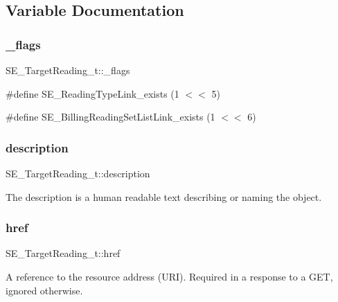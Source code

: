 \subsection{Variable Documentation}
\mbox{\label{group__TargetReading_gaaf344e38f87e901981538342c80f3d6f}} 
\subsubsection{\texorpdfstring{\+\_\+flags}{\_flags}}
{\footnotesize\ttfamily S\+E\+\_\+\+Target\+Reading\+\_\+t\+::\+\_\+flags}

\#define S\+E\+\_\+\+Reading\+Type\+Link\+\_\+exists (1 $<$$<$ 5)

\#define S\+E\+\_\+\+Billing\+Reading\+Set\+List\+Link\+\_\+exists (1 $<$$<$ 6) \mbox{\label{group__TargetReading_gab528105e52e927d416310936aefb3b49}} 
\subsubsection{\texorpdfstring{description}{description}}
{\footnotesize\ttfamily S\+E\+\_\+\+Target\+Reading\+\_\+t\+::description}

The description is a human readable text describing or naming the object. \mbox{\label{group__TargetReading_gaea2bf3a76c988bc1e063e3230087b17e}} 
\subsubsection{\texorpdfstring{href}{href}}
{\footnotesize\ttfamily S\+E\+\_\+\+Target\+Reading\+\_\+t\+::href}

A reference to the resource address (U\+RI). Required in a response to a G\+ET, ignored otherwise. \mbox{\label{group__TargetReading_gaba82706ff98671daae1c9e06ee1e0d12}} 
